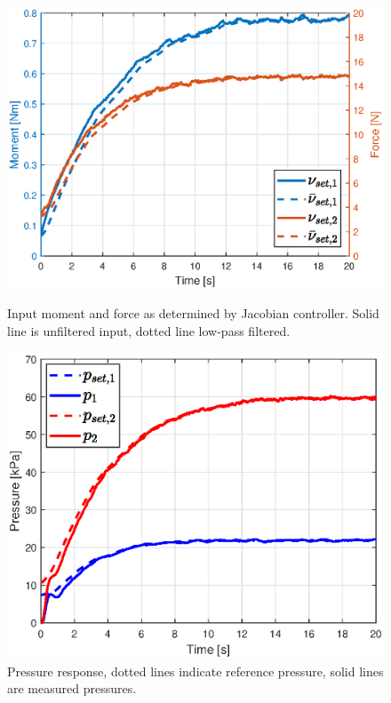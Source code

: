 \newpage



\begin{figure}[H] 
    \begin{minipage}[b]{0.49\linewidth}
     \centering
    \includegraphics[width=\linewidth]{Figures/Chapter5/jacinputstepright.eps} 
    \caption{Input moment and force as determined by Jacobian controller. Solid line is unfiltered input, dotted line low-pass filtered. } 
    \label{fig5:nuright} 
       \end{minipage} 
    \begin{minipage}[b]{0.49\linewidth}
     \centering
    \includegraphics[width=\linewidth]{Figures/Chapter5/pressurestepright.eps} 
    \caption{Pressure response, dotted lines indicate reference pressure, solid lines are measured pressures.} 
    \label{fig5:pright} 
    \end{minipage} 
\end{figure}



